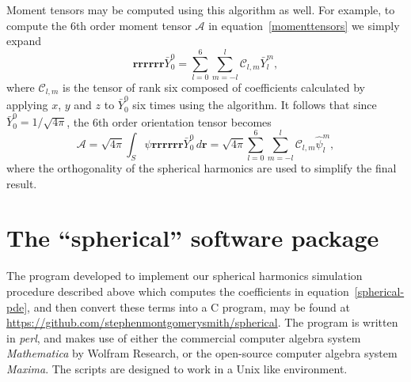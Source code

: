 \documentclass{amsart}
\newcommand\br{{\mathbf r}}
\begin{document}
Moment tensors may be computed using this algorithm as well. For example, to compute the 6th order moment tensor $\mathcal A$ in
equation~\eqref{momenttensors} we simply expand
\begin{equation}
\label{expand Y_0^0} \br\br\br\br\br\br \bar Y_0^0 = \sum_{l=0}^6
\sum_{m=-l}^l \mathcal C_{l,m} \bar Y_l^m,
\end{equation}
where $\mathcal C_{l,m}$ is the tensor of rank six composed of coefficients calculated by applying $x$, $y$ and $z$ to $\bar Y_0^0$ six times using the algorithm. It follows that since $\bar Y_0^0 = 1/\sqrt{4\pi}$, the 6th order orientation tensor
becomes
\begin{equation}
\label{moment tensor} \mathcal A = \sqrt{4\pi} \int_S \psi
\br\br\br\br\br\br \bar Y_0^0 \, d\br = \sqrt{4\pi} \sum_{l=0}^6
\sum_{m=-l}^l \mathcal C_{l,m} \hat\psi_l^m ,
\end{equation}
where the orthogonality of the spherical harmonics are used to simplify the final result.

\section{The ``spherical'' software package}

The program developed to implement our spherical harmonics
simulation procedure described above which computes the coefficients
in equation~\eqref{spherical-pde}, and then convert these terms into
a C program, may be found at
\url{https://github.com/stephenmontgomerysmith/spherical}. The
program is written in \emph{perl}, and makes use of either the
commercial computer algebra system \emph{Mathematica} by Wolfram
Research, or the open-source computer algebra system \emph{Maxima}.
The scripts are designed to work in a Unix like environment.
\end{document}

